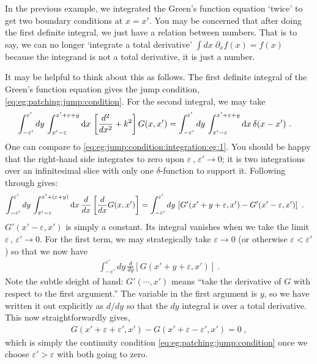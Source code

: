 \begin{example}%
In the previous example, we integrated the Green's function equation `twice' to get two boundary conditions at $x=x'$. You may be concerned that after doing the first definite integral, we just have a relation between numbers. That is to say, we can no longer `integrate a total derivative' $\int dx\; \partial_x f(x) = f(x)$ because the integrand is not a total derivative, it is just a number. 

It may be helpful to think about this as follows. The first definite integral of the Green's function equation gives the jump condition, \eqref{eq:eg:patching:jump:condition}. For the second integral, we may take
\begin{align}
  \int_{-\varepsilon'}^{\varepsilon'}
  dy \,
  \int_{x'-\varepsilon}^{x'+\varepsilon+y}
  \operatorname{d}\mkern-3mu^{}\mkern-1mu{x} \, 
  \left[
   \frac{d^2}{dx^2} + k^2
  \right]
  G(x,x')
  &=
  \int_{-\varepsilon'}^{\varepsilon'}
  dy \,
  \int_{x'-\varepsilon}^{x'+\varepsilon+y}
  \operatorname{d}\mkern-3mu^{}\mkern-1mu{x} \, 
  \delta (x-x') 
  \ .
\end{align}
One can compare to \eqref{eq:eg:jump:condition:integration:eg:1}. You should be happy that the right-hand side integrates to zero upon $\varepsilon\, , \, \varepsilon' \to 0$; it is two integrations over an infinitesimal slice with only one $\delta$-function to support it. Following through gives:
\begin{align}
  \int_{-\varepsilon'}^{\varepsilon'}
  dy \,
  \int_{x'-\varepsilon}^{x'+(\varepsilon+y)}
  \operatorname{d}\mkern-3mu^{}\mkern-1mu{x} \, 
  \frac{d}{dx}
  \left[
   \frac{d}{dx}
   G(x,x')
  \right]
  &=
  \int_{-\varepsilon'}^{\varepsilon'}
  dy \,
  \left[
   G'(x'+y+\varepsilon,x')
   -
   G'(x'-\varepsilon, x')
  \right] \ .
\end{align}
$G'(x'-\varepsilon, x')$ is simply a constant. Its integral vanishes when we take the limit $\varepsilon\, ,\, \varepsilon'\to 0$. For the first term, we may strategically take $\varepsilon\to 0$  (or otherwise $\varepsilon < \varepsilon'$) so that we now have
\begin{align}
  \int_{-\varepsilon'}^{\varepsilon'}
  dy \,
  \frac{d}{dy}
  \left[
   G(x'+y+\varepsilon,x')
   \right] \ .
\end{align}
Note the subtle sleight of hand: $G'(\cdots, x')$ means ``take the derivative of $G$ with respect to the first argument.'' The variable in the first argument is $y$, so we have written it out explicitly as $d/dy$ so that the $dy$ integral is over a total derivative. This now straightforwardly gives, 
\begin{align}
  G(x'+\varepsilon+\varepsilon', x') 
  -
  G(x'+\varepsilon-\varepsilon', x') 
  = 0 \ ,
\end{align}
which is simply the continuity condition \eqref{eq:eg:patching:jump:condition} once we choose $\varepsilon' > \varepsilon$ with both going to zero.
\end{example}

